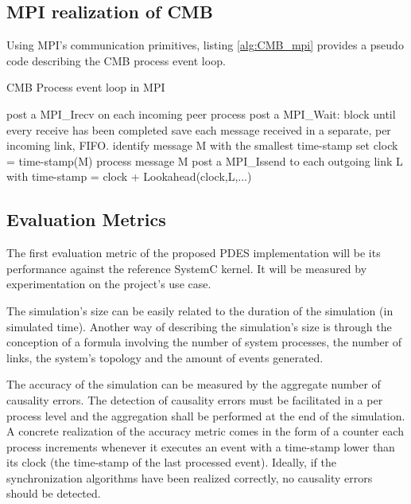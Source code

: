 \documentclass[12pt,twoside]{article}
\begin{document}
\subsection{MPI realization of CMB}
\label{sec-5-5}
Using MPI's communication primitives, listing \ref{alg:CMB_mpi} provides a pseudo code describing the CMB process event loop.
\begin{algorithm}
\caption{CMB Process event loop in MPI}
\label{alg:CMB_mpi}
\begin{algorithmic}[2]

      \State post a MPI\_Irecv on each incoming peer process
      \State post a MPI\_Wait: block until every receive has been completed
      \State save each message received in a separate, per incoming link, FIFO.
      \State identify message M with the smallest time-stamp
      \State set clock = time-stamp(M)
      \State process message M
      \State post a MPI\_Issend to each outgoing link L with time-stamp = clock + Lookahead(clock,L,...)
   \EndWhile

\end{algorithmic}
\end{algorithm}


\subsection{Evaluation Metrics}
\label{sec-5-6}
The first evaluation metric of the proposed PDES implementation will be its performance against the reference SystemC kernel.
It will be measured by experimentation on the project's use case.

The simulation's size can be easily related to the duration of the simulation (in simulated time).
Another way of describing the simulation's size is through the conception of a formula involving the number of system processes, the number of links, the system's topology and the amount of events generated.

The accuracy of the simulation can be measured by the aggregate number of causality errors.
The detection of causality errors must be facilitated in a per process level and the aggregation shall be performed at the end of the simulation.
A concrete realization of the accuracy metric comes in the form of a counter each process increments whenever it executes an event with a time-stamp lower than its clock (the time-stamp of the last processed event).
Ideally, if the synchronization algorithms have been realized correctly, no causality errors should be detected.
\end{document}
